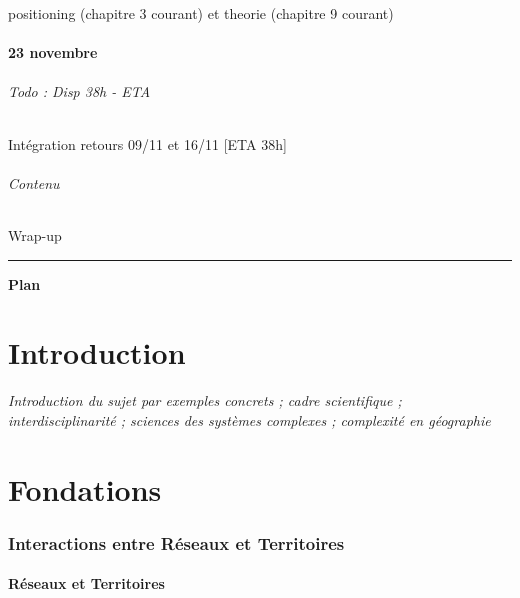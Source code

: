 positioning (chapitre 3 courant) et theorie (chapitre 9 courant)

\subsection*{23 novembre}


\paragraph{Todo : Disp 38h - ETA }

Intégration retours 09/11 et 16/11 [ETA 38h]


\paragraph{Contenu}

Wrap-up



\vspace{2cm}

\hrule

\vspace{0.5cm}

{\hfill
\Huge \textbf{Plan}\hfill
}

\vspace{1.5cm}

\part*{Introduction}

\textit{Introduction du sujet par exemples concrets ; cadre scientifique ; interdisciplinarité ; sciences des systèmes complexes ; complexité en géographie}

\part{Fondations}


\section{Interactions entre Réseaux et Territoires}

\subsection{Réseaux et Territoires}

